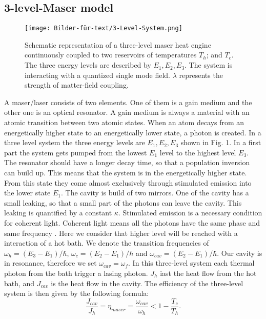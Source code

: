 \documentclass[12pt,a4paper]{article}
\begin{document}
\subsection{3-level-Maser model}
\begin{figure}[h!] 
\texttt{[image: Bilder-für-text/3-Level-System.png]}
\caption{Schematic representation of a three-level maser heat engine
continuously coupled to two reservoirs of temperatures $T_h$;  and
$T_c$. The three energy levels are described by $E_1,E_2,E_3$. The
system is interacting with a quantized single mode field. $\lambda$
represents the strength of matter-field coupling.}
\end{figure}
A maser/laser consists of two elements. One of them is a gain medium and the other one is an optical resonator. A gain medium is always a material with an atomic transition between two atomic states. When an atom decays from an energetically higher state to an energetically lower state, a photon is created.
In a three level system the three energy levels are $E_1,E_2,E_3$ shown in Fig. 1. In a first part the system gets pumped from the lowest $E_1$ level to the highest level $ E_3$. The resonator should have a longer decay time, so that a population inversion can build up. This means that the system is in the energetically higher state. From this state they come almost exclusively through stimulated emission into the lower state $ E_1$.  The cavity is build of two mirrors. One of the cavity has a small leaking, so that a small part of the photons can leave the cavity. This leaking is quantified by a constant $\kappa$. 
Stimulated emission is a necessary condition for coherent light. Coherent light means all the photons have the same phase and same frequency \cite{Li2017}.
Here we consider that higher level will be reached with a interaction of a hot bath.  
We denote the transition frequencies of $\omega_h=(E_3-E_1)/\hbar$, $\omega_c=(E_2-E_1)/\hbar$ and $\omega_{cav}=(E_2-E_1)/\hbar$.
Our cavity is in  resonance, therefore we set $\omega_{cav}=\omega_f$. 
In this three-level system each thermal photon from the bath trigger a lasing photon. 
$J_h$ iast the heat flow from the hot bath, and $J_{cav}$ is the heat flow in the cavity.
The efficiency of the three-level system is then given by the following formula:
\begin{equation}
\frac{J_{cav}}{J_h}=\eta_{maser}=\frac{\omega_{cav}}{\omega_h}<1-\frac{T_c}{T_h}.
\end{equation}
\end{document}
